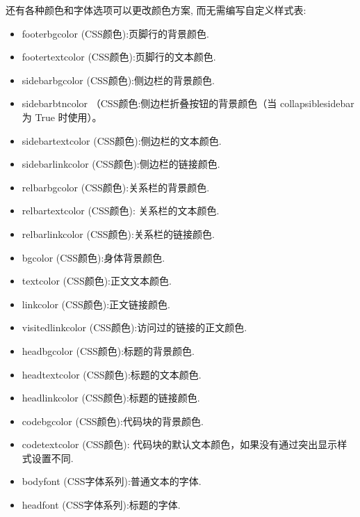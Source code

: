 \documentclass[a4paper,10pt,english]{sphinxmanual}
\begin{document}
\sphinxAtStartPar
还有各种颜色和字体选项可以更改颜色方案, 而无需编写自定义样式表:
\begin{itemize}
\item {} 
\sphinxAtStartPar
footerbgcolor (CSS颜色):页脚行的背景颜色.

\item {} 
\sphinxAtStartPar
footertextcolor (CSS颜色):页脚行的文本颜色.

\item {} 
\sphinxAtStartPar
sidebarbgcolor (CSS颜色):侧边栏的背景颜色.

\item {} 
\sphinxAtStartPar
sidebarbtncolor （CSS颜色:侧边栏折叠按钮的背景颜色（当 collapsiblesidebar 为 True 时使用）。

\item {} 
\sphinxAtStartPar
sidebartextcolor (CSS颜色):侧边栏的文本颜色.

\item {} 
\sphinxAtStartPar
sidebarlinkcolor (CSS颜色):侧边栏的链接颜色.

\item {} 
\sphinxAtStartPar
relbarbgcolor (CSS颜色):关系栏的背景颜色.

\item {} 
\sphinxAtStartPar
relbartextcolor (CSS颜色): 关系栏的文本颜色.

\item {} 
\sphinxAtStartPar
relbarlinkcolor (CSS颜色):关系栏的链接颜色.

\item {} 
\sphinxAtStartPar
bgcolor (CSS颜色):身体背景颜色.

\item {} 
\sphinxAtStartPar
textcolor (CSS颜色):正文文本颜色.

\item {} 
\sphinxAtStartPar
linkcolor (CSS颜色):正文链接颜色.

\item {} 
\sphinxAtStartPar
visitedlinkcolor (CSS颜色):访问过的链接的正文颜色.

\item {} 
\sphinxAtStartPar
headbgcolor (CSS颜色):标题的背景颜色.

\item {} 
\sphinxAtStartPar
headtextcolor (CSS颜色):标题的文本颜色.

\item {} 
\sphinxAtStartPar
headlinkcolor (CSS颜色):标题的链接颜色.

\item {} 
\sphinxAtStartPar
codebgcolor (CSS颜色):代码块的背景颜色.

\item {} 
\sphinxAtStartPar
codetextcolor (CSS颜色): 代码块的默认文本颜色，如果没有通过突出显示样式设置不同.

\item {} 
\sphinxAtStartPar
bodyfont (CSS字体系列):普通文本的字体.

\item {} 
\sphinxAtStartPar
headfont (CSS字体系列):标题的字体.

\end{itemize}
\end{document}
